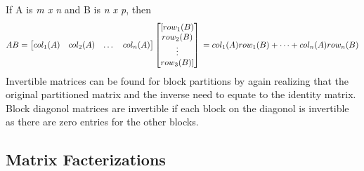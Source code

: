 \documentclass[12pt]{article}
\begin{document}
\newline
\newline
\newline
If A is \textit{m x n} and B is \textit{n x p}, then 
$$
AB=\begin{bmatrix}
    col_1(A) & col_2(A) & \dots & col_n(A)
\end{bmatrix} \begin{bmatrix}
    [row_1(B) \\ row_2(B) \\ \vdots \\ row_3(B)] \\ 
\end{bmatrix}\\=col_1(A)row_1(B) + \dots + col_n(A)row_n(B)
$$
\newline
Invertible matrices can be found for block partitions by again realizing that the original partitioned matrix and the inverse need to equate to the identity matrix. %
Block diagonol matrices are invertible if each block on the diagonol is invertible as there are zero entries for the other blocks. 
\subsection{Matrix Facterizations}
\end{document}
